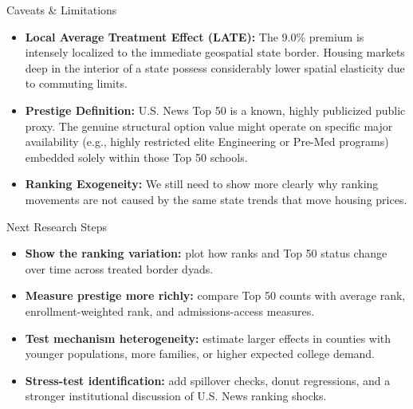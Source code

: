 \documentclass[10pt, aspectratio=169]{beamer}
\begin{document}

\begin{frame}{Caveats \& Limitations}
    \begin{itemize}
        \item \textbf{Local Average Treatment Effect (LATE):} The 9.0\% premium is intensely localized to the immediate geospatial state border. Housing markets deep in the interior of a state possess considerably lower spatial elasticity due to commuting limits.
        \item \textbf{Prestige Definition:} U.S. News Top 50 is a known, highly publicized public proxy. The genuine structural option value might operate on specific major availability (e.g., highly restricted elite Engineering or Pre-Med programs) embedded solely within those Top 50 schools.
        \item \textbf{Ranking Exogeneity:} We still need to show more clearly why ranking movements are not caused by the same state trends that move housing prices.
    \end{itemize}
\end{frame}

\begin{frame}{Next Research Steps}
    \begin{itemize}
        \item \textbf{Show the ranking variation:} plot how ranks and Top 50 status change over time across treated border dyads.
        \item \textbf{Measure prestige more richly:} compare Top 50 counts with average rank, enrollment-weighted rank, and admissions-access measures.
        \item \textbf{Test mechanism heterogeneity:} estimate larger effects in counties with younger populations, more families, or higher expected college demand.
        \item \textbf{Stress-test identification:} add spillover checks, donut regressions, and a stronger institutional discussion of U.S. News ranking shocks.
    \end{itemize}
\end{frame}
\end{document}
